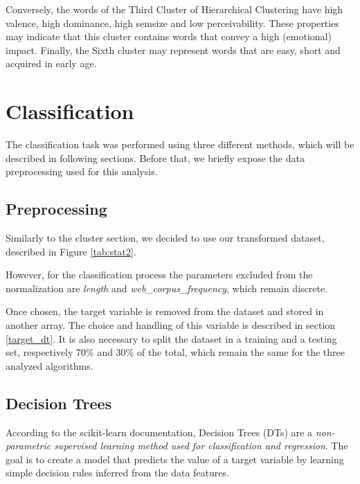 \documentclass[a4paper,11pt,dvipsnames]{article}
\begin{document}
Conversely, the words of the Third Cluster of Hierarchical Clustering have high valence, high dominance, high semsize and low perceivability. These properties may indicate that this cluster contains words that convey a high (emotional) impact. Finally, the Sixth cluster may represent words that are easy, short and acquired in early age.


\section{Classification}

The classification task was performed using three different methods, which will be described in following sections. Before that, we briefly expose the data preprocessing used for this analysis.  

\subsection{Preprocessing}

Similarly to the cluster section, we decided to use our transformed dataset, described in Figure \ref{tab:stat2}. 

However, for the classification process the parameters excluded from the normalization are \textit{length} and \textit{web\_corpus\_frequency}, which remain discrete.

Once chosen, the target variable is removed from the dataset and stored in another array. The choice and handling of this variable is described in section \ref{target_dt}. It is also necessary to split the dataset in a training and a testing set, respectively 70\% and 30\% of the total, which remain the same for the three analyzed algorithms.

\subsection{Decision Trees}\label{sec:decisio-tree}\label{sec:building_tree}

According to the scikit-learn documentation, Decision Trees (DTs) are a \textit{non-parametric supervised learning method used for classification and regression}\cite{JMLR:v12:pedregosa11a}. The goal is to create a model that predicts the value of a target variable by learning simple decision rules inferred from the data features.
\end{document}
